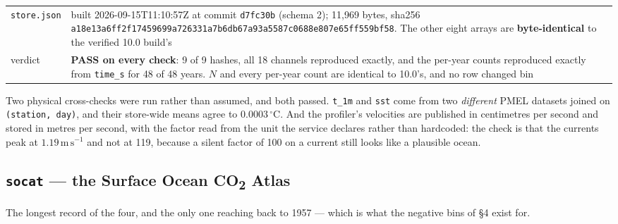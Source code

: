 \documentclass[10pt]{article}
\newcommand{\code}[1]{\texttt{#1}}
\begin{document}
\begin{table}[h]
\begin{tabular}{@{}>{\raggedright\arraybackslash}p{2.8cm}>{\raggedright\arraybackslash}p{12.5cm}@{}}
\code{store.json} & built 2026-09-15T11:10:57Z at commit \code{d7fc30b} (schema 2); 11,969 bytes, sha256 \code{a18e13a6ff2f17459699a726331a7b6db67a93a5587c0688e807e65ff559bf58}. The other eight arrays are \textbf{byte-identical} to the verified 10.0 build's \\
verdict & \textbf{PASS on every check}: 9 of 9 hashes, all 18 channels reproduced exactly, and the per-year counts reproduced exactly from \code{time\_s} for 48 of 48 years. $N$ and every per-year count are identical to 10.0's, and no row changed bin \\
\bottomrule
\end{tabular}
\end{table}

Two physical cross-checks were run rather than assumed, and both passed.
\code{t\_1m} and \code{sst} come from two \emph{different} PMEL datasets joined
on \code{(station, day)}, and their store-wide means agree to
$0.0003\,^\circ$C. And the profiler's velocities are published in centimetres
per second and stored in metres per second, with the factor read from the unit
the service declares rather than hardcoded: the check is that the currents peak
at $1.19\,\mathrm{m\,s^{-1}}$ and not at 119, because a silent factor of 100 on
a current still looks like a plausible ocean.

\subsection{\code{socat} --- the Surface Ocean CO\textsubscript{2} Atlas}

The longest record of the four, and the only one reaching back to 1957 --- which
is what the negative bins of §4 exist for.
\end{document}
